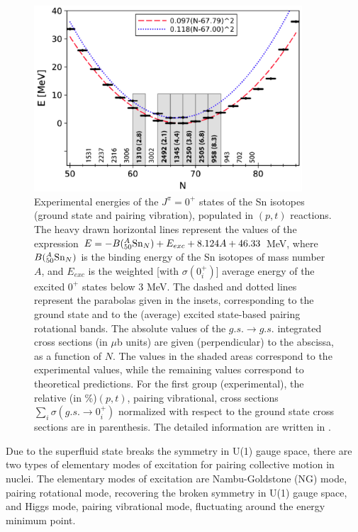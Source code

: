 \documentclass[11pt]{book} %
\begin{document}
\begin{figure}[tb]
 \begin{center}
    \includegraphics[width=100mm]{images/pair_rot.eps}
 \end{center}
  \caption{Experimental energies of the $J^{\pi}=0^+$ states of the Sn isotopes (ground state and pairing vibration),
populated in $(p, t)$ reactions. The heavy drawn horizontal lines
represent the values of the expression $E=-B({}_{50}^{A}{\rm Sn}_{N})+E_{exc}+
8.124A+46.33$ MeV, where $B({}_{50}^{A}{\rm Sn}_{N})$ is the binding energy
of the Sn isotopes of mass number $A$, and $E_{exc}$ is the
weighted [with $\sigma(0_i^+)$] average energy of the excited $0^+$ states
below 3 MeV. The dashed and dotted lines represent the parabolas
given in the insets, corresponding to the ground state and to
the (average) excited state-based pairing rotational bands. The
absolute values of the $g.s.\to g.s.$ integrated cross sections (in $\mu$b units) are given (perpendicular) to the abscissa, as a function
of $N$. The values in the shaded areas correspond to the experimental values, while the remaining values correspond to theoretical
predictions. For the first group (experimental), the relative
(in \%)$(p, t)$, pairing vibrational, cross sections $\sum_i\sigma(g.s.\to 0_i^+)$
normalized with respect to the ground state cross sections are in parenthesis. The detailed information are written in \cite{PF11}.}
  \label{pair_rot}
\end{figure}


Due to the superfluid state breaks the symmetry in U(1) gauge space, there are two types of elementary modes of excitation for pairing collective motion in nuclei. The elementary modes of excitation are Nambu-Goldstone (NG) mode, pairing rotational mode, recovering the broken symmetry in U(1) gauge space, and Higgs mode, pairing vibrational mode, fluctuating around the energy minimum point.
\end{document}
